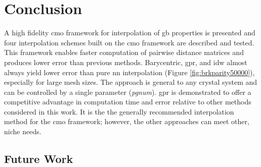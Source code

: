 \documentclass[preprint,12pt]{elsarticle}
\begin{document}
\begin{figure}
{    %
    }
    \label{fig:runtime}
\end{figure}

\section{Conclusion} \label{sec:conclusion}

A high fidelity \gls{cmo} framework for interpolation of \gls{gb} properties is presented and four interpolation schemes built on the \gls{cmo} framework are described and tested. This framework enables faster computation of pairwise distance matrices and produces lower error than previous methods.
Barycentric, \gls{gpr}, and \gls{idw} almost always yield lower error than pure \gls{nn} interpolation (Figure \ref{fig:brkparity50000}), especially for large mesh sizes. The approach is general to any crystal system and can be controlled by a single parameter (\textit{pgnum}). \Gls{gpr} is demonstrated to offer a competitive advantage in computation time and error relative to other methods considered in this work. It is the the generally recommended interpolation method for the \gls{cmo} framework; however, the other approaches can meet other, niche needs.
    
\subsection{Future Work} \label{sec:conclusions:future}
\end{document}
